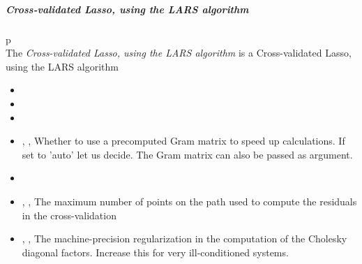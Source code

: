 \subparagraph{Cross-validated Lasso, using the LARS algorithm}
p\mbox{}
\\The \textit{Cross-validated Lasso, using the LARS algorithm} is a
Cross-validated Lasso, using the LARS algorithm
\begin{itemize}
  \item {}
  \item \verDescriptionB
  \item {}
  \item {} , ,
  Whether to use a precomputed Gram matrix to speed up calculations.
  If set to 'auto' let us decide.
  The Gram matrix can also be passed as argument.
  \item \maxIterDescription{}
  \item {}, ,
  The maximum number of points on the path used to compute the residuals in the
  cross-validation
  \item {} , ,
  The machine-precision regularization in the computation of the Cholesky
  diagonal factors.
  Increase this for very ill-conditioned systems.
\end{itemize}

